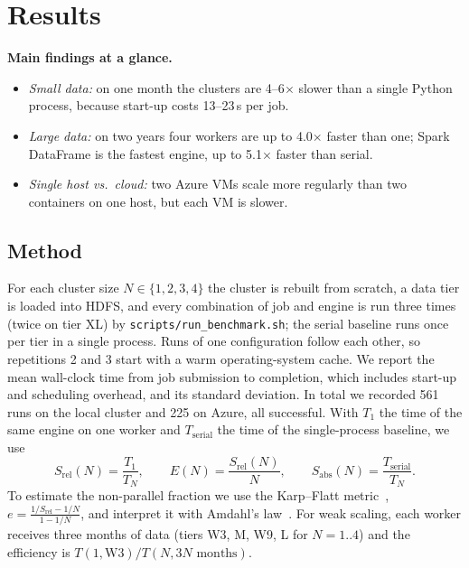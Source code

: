 \section{Results}\label{sec:results}

\noindent\textbf{Main findings at a glance.}
\begin{itemize}
  \item \emph{Small data:} on one month the clusters are 4--6$\times$ slower than a
        single Python process, because start-up costs 13--23\,s per job.
  \item \emph{Large data:} on two years four workers are up to 4.0$\times$ faster than
        one; Spark DataFrame is the fastest engine, up to 5.1$\times$ faster than serial.
  \item \emph{Single host vs.\ cloud:} two Azure VMs scale more regularly than two
        containers on one host, but each VM is slower.
\end{itemize}

\subsection{Method}
For each cluster size $N\in\{1,2,3,4\}$ the cluster is rebuilt from scratch, a data
tier is loaded into HDFS, and every combination of job and engine is run three times
(twice on tier XL) by \texttt{scripts/run\_benchmark.sh}; the serial baseline runs
once per tier in a single process. Runs of one configuration follow each other, so
repetitions 2 and 3 start with a warm operating-system cache. We report the mean
wall-clock time from job submission to completion, which includes start-up and
scheduling overhead, and its standard deviation. In total we recorded 561 runs on the
local cluster and 225 on Azure, all successful. With $T_1$ the time of the same engine
on one worker and $T_\text{serial}$ the time of the single-process baseline, we use
\begin{equation}
S_\text{rel}(N)=\frac{T_1}{T_N},\qquad E(N)=\frac{S_\text{rel}(N)}{N},\qquad
S_\text{abs}(N)=\frac{T_\text{serial}}{T_N}.
\end{equation}
To estimate the non-parallel fraction we use the Karp--Flatt
metric~\cite{karp1990measuring}, $e=\frac{1/S_\text{rel}-1/N}{1-1/N}$, and interpret
it with Amdahl's law~\cite{amdahl1967validity}. For weak scaling, each worker receives
three months of data (tiers W3, M, W9, L for $N=1..4$) and the efficiency is
$T(1,\text{W3})/T(N,3N\text{ months})$.

